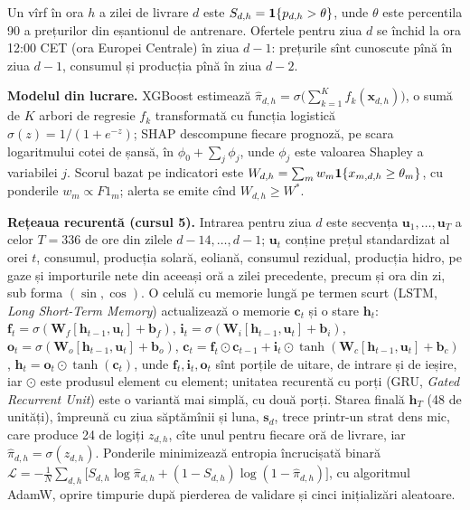 {Un vîrf în ora $h$ a zilei de livrare $d$ este $S_{d,h}=\mathbf{1}\{p_{d,h}>\theta\}$, unde $\theta$ este percentila 90 a prețurilor din eșantionul de antrenare. Ofertele pentru ziua $d$ se închid la ora 12:00 CET (ora Europei Centrale) în ziua $d-1$: prețurile sînt cunoscute pînă în ziua $d-1$, consumul și producția pînă în ziua $d-2$.

\textbf{Modelul din lucrare.} XGBoost estimează $\hat\pi_{d,h}=\sigma\big(\sum_{k=1}^{K}f_k(\mathbf x_{d,h})\big)$, o sumă de $K$ arbori de regresie $f_k$ transformată cu funcția logistică $\sigma(z)=1/(1+e^{-z})$; SHAP descompune fiecare prognoză, pe scara logaritmului cotei de șansă, în $\phi_0+\sum_j\phi_{j}$, unde $\phi_j$ este valoarea Shapley a variabilei $j$.
Scorul bazat pe indicatori este $W_{d,h}=\sum_m w_m\mathbf{1}\{x_{m,d,h}\ge\theta_m\}$, cu ponderile $w_m\propto F1_m$; alerta se emite cînd $W_{d,h}\ge W^*$.

\textbf{Rețeaua recurentă (cursul 5).} Intrarea pentru ziua $d$ este secvența $\mathbf u_1,\dots,\mathbf u_{T}$ a celor $T=336$ de ore din zilele $d-14,\dots,d-1$; $\mathbf u_t$ conține prețul standardizat al orei $t$, consumul, producția solară, eoliană, consumul rezidual, producția hidro, pe gaze și importurile nete din aceeași oră a zilei precedente, precum și ora din zi, sub forma $(\sin,\cos)$.
O celulă cu memorie lungă pe termen scurt (LSTM, \emph{Long Short-Term Memory}) actualizează o memorie $\mathbf c_t$ și o stare $\mathbf h_t$:
$\mathbf f_t=\sigma(\mathbf W_f[\mathbf h_{t-1},\mathbf u_t]+\mathbf b_f)$, $\mathbf i_t=\sigma(\mathbf W_i[\mathbf h_{t-1},\mathbf u_t]+\mathbf b_i)$, $\mathbf o_t=\sigma(\mathbf W_o[\mathbf h_{t-1},\mathbf u_t]+\mathbf b_o)$,
$\mathbf c_t=\mathbf f_t\odot\mathbf c_{t-1}+\mathbf i_t\odot\tanh(\mathbf W_c[\mathbf h_{t-1},\mathbf u_t]+\mathbf b_c)$, $\mathbf h_t=\mathbf o_t\odot\tanh(\mathbf c_t)$,
unde $\mathbf f_t,\mathbf i_t,\mathbf o_t$ sînt porțile de uitare, de intrare și de ieșire, iar $\odot$ este produsul element cu element; unitatea recurentă cu porți (GRU, \emph{Gated Recurrent Unit}) este o variantă mai simplă, cu două porți.
Starea finală $\mathbf h_T$ (48 de unități), împreună cu ziua săptămînii și luna, $\mathbf s_d$, trece printr-un strat dens mic, care produce 24 de logiți $z_{d,h}$, cîte unul pentru fiecare oră de livrare, iar $\hat\pi_{d,h}=\sigma(z_{d,h})$.
Ponderile minimizează entropia încrucișată binară $\mathcal L=-\frac1N\sum_{d,h}\big[S_{d,h}\log\hat\pi_{d,h}+(1-S_{d,h})\log(1-\hat\pi_{d,h})\big]$, cu algoritmul AdamW, oprire timpurie după pierderea de validare și cinci inițializări aleatoare.

}
